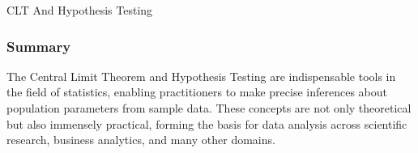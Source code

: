 \begin{notes}{CLT And Hypothesis Testing}
    \subsubsection*{Summary}
    
    The Central Limit Theorem and Hypothesis Testing are indispensable tools in the field of statistics, enabling practitioners to make precise inferences about population parameters from sample data. 
    These concepts are not only theoretical but also immensely practical, forming the basis for data analysis across scientific research, business analytics, and many other domains.    
\end{notes}